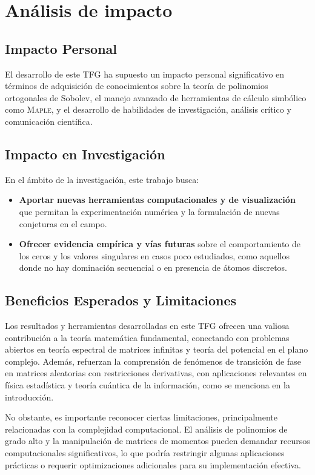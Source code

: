 \chapter{Análisis de impacto}

\section{Impacto Personal}
El desarrollo de este TFG ha supuesto un impacto personal significativo en términos de adquisición de conocimientos sobre la teoría de polinomios ortogonales de Sobolev, el manejo avanzado de herramientas de cálculo simbólico como \textsc{Maple}, y el desarrollo de habilidades de investigación, análisis crítico y comunicación científica.

\section{Impacto en Investigación}
En el ámbito de la investigación, este trabajo busca:
\begin{itemize}
	\item \textbf{Aportar nuevas herramientas computacionales y de visualización} que permitan la experimentación numérica y la formulación de nuevas conjeturas en el campo.
	\item \textbf{Ofrecer evidencia empírica y vías futuras} sobre el comportamiento de los ceros y los valores singulares en casos poco estudiados, como aquellos donde no hay dominación secuencial o en presencia de átomos discretos.
\end{itemize}

\section{Beneficios Esperados y Limitaciones}
Los resultados y herramientas desarrolladas en este TFG ofrecen una valiosa contribución a la teoría matemática fundamental, conectando con problemas abiertos en teoría espectral de matrices infinitas y teoría del potencial en el plano complejo. Además, refuerzan la comprensión de fenómenos de transición de fase en matrices aleatorias con restricciones derivativas, con aplicaciones relevantes en física estadística y teoría cuántica de la información, como se menciona en la introducción.

No obstante, es importante reconocer ciertas limitaciones, principalmente relacionadas con la complejidad computacional. El análisis de polinomios de grado alto y la manipulación de matrices de momentos pueden demandar recursos computacionales significativos, lo que podría restringir algunas aplicaciones prácticas o requerir optimizaciones adicionales para su implementación efectiva.

